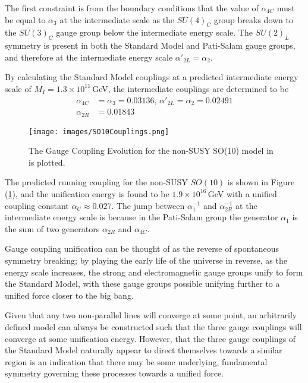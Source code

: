 \documentclass{article}
\begin{document}
The first constraint is from the boundary conditions that the value of $\alpha_{4C}$ must be equal to $\alpha_{3}$ at the intermediate scale as the $SU(4)_C$ group breaks down to the $SU(3)_C$ gauge group below the intermediate energy scale. The $SU(2)_L$ symmetry is present in both the Standard Model and Pati-Salam gauge groups, and therefore at the intermediate energy scale $\alpha'_{2L} = \alpha_{2}$.

By calculating the Standard Model couplings at a predicted intermediate energy scale of $M_I = 1.3\times10^{11}\,$GeV, the intermediate couplings are determined to be
\begin{equation}
\begin{split}
\alpha_{4C} & = \alpha_3 = 0.03136,\, \alpha'_{2L} = \alpha_2 = 0.02491\\
\alpha_{2R} & = 0.01843
\end{split}
\end{equation}

\begin{figure}
    \centering
    \texttt{[image: images/SO10Couplings.png]}
    \caption{The Gauge Coupling Evolution for the non-SUSY SO(10) model in \cite{SO10_2} is plotted.\label{fig:SO10Coupling2}
}
\end{figure}

The predicted running coupling for the non-SUSY $SO(10)$ is shown in Figure (\ref{fig:SO10Coupling2}), and the unification energy is found to be $1.9\times10^{16}\,$GeV with a unified coupling constant $\alpha_U \approx 0.027$. The jump between $\alpha^{-1}_1$ and $\alpha^{-1}_{2R}$ at the intermediate energy scale is because in the Pati-Salam group the generator $\alpha_1$ is the sum of two generators $\alpha_{2R}$ and $\alpha_{4C}$.

Gauge coupling unification can be thought of as the reverse of spontaneous symmetry breaking; by playing the early life of the universe in reverse, as the energy scale increases, the strong and electromagnetic gauge groups unify to form the Standard Model, with these gauge groups possible unifying further to a unified force closer to the big bang.

Given that any two non-parallel lines will converge at some point, an arbitrarily defined model can always be constructed such that the three gauge couplings will converge at some unification energy. However, that the three gauge couplings of the Standard Model naturally appear to direct themselves towards a similar region is an indication that there may be some underlying, fundamental symmetry governing these processes towards a unified force.
\end{document}
